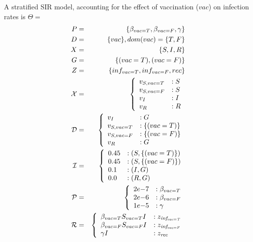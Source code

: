 \begin{example}\label{ex:stratified}
	A stratified SIR model, accounting for the effect of vaccination ($vac$) on infection rates is $\Theta =$
	\begin{eqnarray*}
		P &=& \{\beta_{vac=T}, \beta_{vac=F}, \gamma\}\\
		D &=& \{vac\}, dom(vac) = \{T, F\}\\
		X &=& \{S, I, R\}\\
		G &=& \{(vac=T), (vac=F)\}\\
		Z &=& \{inf_{vac=T}, inf_{vac=F}, rec\}\\
		{\cal X} &=& \left\{
		\begin{array}{ll}
			v_{S,vac=T} & :S \\
			v_{S,vac=F} & :S \\
			v_I         & :I \\
			v_R         & :R
		\end{array}\right.\\
		{\cal D} &=& \left\{
		\begin{array}{ll}
			v_I         & :G           \\
			v_{S,vac=T} & :\{(vac=T)\} \\
			v_{S,vac=F} & :\{(vac=F)\} \\
			v_R         & :G           \\
		\end{array}\right.\\
		{\cal I} &=& \left\{
		\begin{array}{ll}
			0.45 & :(S,\{(vac=T)\}) \\
			0.45 & :(S,\{(vac=F)\}) \\
			0.1 & :(I, G)          \\
			0.0 & :(R, G)
		\end{array}\right.\\
		{\cal P}&=& \left\{
		\begin{array}{ll}
			2e{-7} & :\beta_{vac=T} \\
			2e{-6} & :\beta_{vac=F} \\
			1e{-5} & :\gamma
		\end{array}\right.\\
		{\cal R} &=& \left\{
		\begin{array}{ll}
			\beta_{vac=T} S_{vac=T} I & : z_{\mathit{inf_{vac=T}}} \\
			\beta_{vac=F} S_{vac=F} I & : z_{\mathit{inf_{vac=F}}} \\
			\gamma I                  & : z_{\mathit{rec}}         \\
		\end{array}\right.\\
	\end{eqnarray*}
\end{example}



